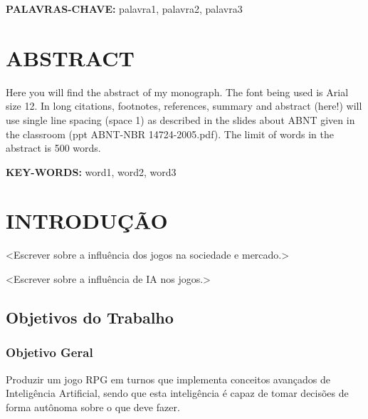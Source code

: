 \documentclass[12pt,a4paper]{article}
\begin{document}
	\vspace{0.8cm}
	\textbf{PALAVRAS-CHAVE:} palavra1, palavra2, palavra3

\onehalfspacing

\clearpage %
\thispagestyle{empty} %
\section*{\hfil ABSTRACT} %
	\singlespace
	Here you will find the abstract of my monograph.
	The font being used is Arial size 12.
	In long citations, footnotes, references, summary and abstract (here!) will use single line spacing (space 1) as described in the slides about ABNT given in the classroom (ppt ABNT-NBR 14724-2005.pdf).
	The limit of words in the abstract is 500 words.
	
	\vspace{0.8cm}
	\textbf{KEY-WORDS:} word1, word2, word3

\onehalfspacing

\clearpage %
\thispagestyle{empty} %
\listoffigures %

\clearpage %
\thispagestyle{empty} %
\listoftables %

\clearpage %
\thispagestyle{empty} %
\tableofcontents %

\clearpage %
\section{INTRODUÇÃO}
	<Escrever sobre a influência dos jogos na sociedade e mercado.>
	
	<Escrever sobre a influência de IA nos jogos.>

	\subsection{Objetivos do Trabalho}
	
		\subsubsection{Objetivo Geral}
			Produzir um jogo RPG em turnos que implementa conceitos avançados de Inteligência Artificial,
			sendo que esta inteligência é capaz de tomar decisões de forma autônoma sobre o que deve fazer.
		
\end{document}
